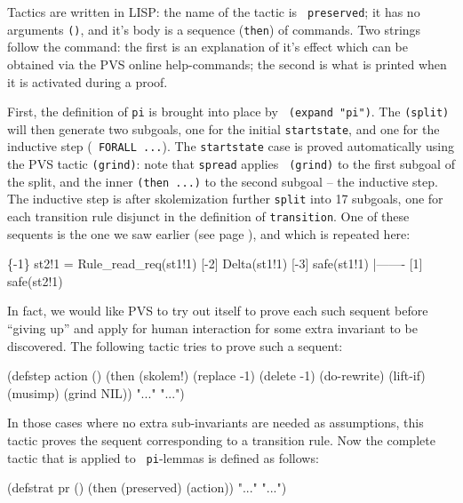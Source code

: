 Tactics    are written in   LISP:  the  name  of  the  tactic is  {\tt
preserved}; it has no arguments {\tt ()}, and it's  body is a sequence
({\tt then})  of commands.  Two strings follow  the command: the first
is an  explanation of it's  effect which can be  obtained  via the PVS
online help-commands;    the second is  what   is printed when   it is
activated during a proof.

First, the definition   of {\tt pi}  is  brought  into place  by  {\tt
(expand "pi")}. The {\tt (split)} will then generate two subgoals, one
for the initial {\tt startstate}, and one for the inductive step ({\tt
FORALL ...}). The {\tt startstate}  case is proved automatically using
the PVS tactic   {\tt (grind)}: note   that {\tt spread}  applies {\tt
(grind)} to the first subgoal  of the split,  and the inner {\tt (then
...)} to the second subgoal --  the inductive step. The inductive step
is  after skolemization further {\tt  split} into 17 subgoals, one for
each transition  rule disjunct in the  definition of {\tt transition}.
One  of these   sequents   is  the  one   we  saw earlier   (see  page
\pageref{rule-sequent}), and which is repeated here:

\begin{smallsession}
  \{-1\}   st2!1 = Rule_read_req(st1!1)
  [-2]   Delta(st1!1)
  [-3]   safe(st1!1)
    |-------
  [1]   safe(st2!1)
\end{smallsession}

In  fact, we would   like PVS to  try out  itself  to prove  each such
sequent before ``giving  up'' and apply  for human interaction for some
extra  invariant  to be  discovered. 
The following tactic tries to prove such a sequent:

\begin{smallsession}
  (defstep action ()
    (then
      (skolem!)
      (replace -1)
      (delete -1)
      (do-rewrite)
      (lift-if)
      (musimp)
      (grind NIL))
    "..."
    "...")
\end{smallsession}

In  those  cases   where  no extra     sub-invariants  are needed   as
assumptions, this tactic  proves    the sequent corresponding    to  a
transition rule.  Now  the complete  tactic  that  is applied to  {\tt
pi}-lemmas is defined as follows:

\begin{smallsession}
  (defstrat pr ()
    (then
      (preserved)
      (action))
    "..."
    "...")
\end{smallsession}


